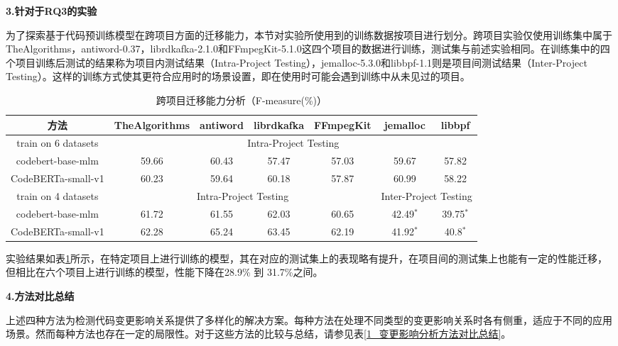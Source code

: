 \textbf{3.针对于RQ3的实验}

为了探索基于代码预训练模型在跨项目方面的迁移能力，本节对实验所使用到的训练数据按项目进行划分。跨项目实验仅使用训练集中属于TheAlgorithms，antiword-0.37，librdkafka-2.1.0和FFmpegKit-5.1.0这四个项目的数据进行训练，测试集与前述实验相同。在训练集中的四个项目训练后测试的结果称为项目内测试结果（Intra-Project Testing），jemalloc-5.3.0和libbpf-1.1则是项目间测试结果（Inter-Project Testing）。这样的训练方式使其更符合应用时的场景设置，即在使用时可能会遇到训练中从未见过的项目。


\begin{table}[htbp]
\caption{跨项目迁移能力分析（F-measure(\%)）}
\label{1_跨项目迁移能力分析}
\vspace{0.5em}\centering\wuhao
\begin{tabular}{c|cccccc}
\toprule
方法& TheAlgorithms & antiword & librdkafka & FFmpegKit & jemalloc & libbpf\\
\midrule
train on 6 datasets & \multicolumn{6}{c}{Intra-Project Testing} \\
\midrule
codebert-base-mlm &  59.66 & 60.43 & 57.47 & 57.03 & 59.67 & 57.82\\
CodeBERTa-small-v1 &  60.23 & 59.64 & 60.18 & 57.87 & 60.99 & 58.22\\
\midrule
train on 4 datasets & \multicolumn{4}{c|}{Intra-Project Testing} & \multicolumn{2}{c}{Inter-Project Testing} \\
\midrule
codebert-base-mlm &   61.72 & 61.55 & 62.03 & \multicolumn{1}{c|}{60.65} & 42.49$^*$ & 39.75$^*$ \\
CodeBERTa-small-v1 &  62.28 & 65.24 & 63.45 & \multicolumn{1}{c|}{62.19} & 41.92$^*$ & 40.8$^*$\\
\bottomrule
\end{tabular}
\end{table}

实验结果如表\ref{1_跨项目迁移能力分析}所示，在特定项目上进行训练的模型，其在对应的测试集上的表现略有提升，在项目间的测试集上也能有一定的性能迁移，但相比在六个项目上进行训练的模型，性能下降在28.9\% 到 31.7\%之间。

\textbf{4.方法对比总结}

上述四种方法为检测代码变更影响关系提供了多样化的解决方案。每种方法在处理不同类型的变更影响关系时各有侧重，适应于不同的应用场景。然而每种方法也存在一定的局限性。对于这些方法的比较与总结，请参见表\ref{1_变更影响分析方法对比总结}。

\clearpage


